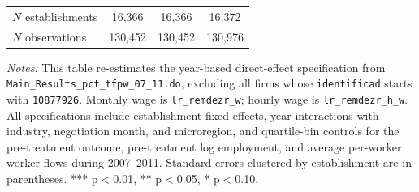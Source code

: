 \begin{table}[!htbp]
\begin{tabular}{lccc}
$N$ establishments & 16{,}366 & 16{,}366 & 16{,}372\\
$N$ observations & 130{,}452 & 130{,}452 & 130{,}976\\
\bottomrule
\end{tabular}
\begin{minipage}{\linewidth}
\footnotesize\vspace{4pt}
\textit{Notes:} This table re-estimates the year-based direct-effect specification from \texttt{Main\_Results\_pct\_tfpw\_07\_11.do}, excluding all firms whose \texttt{identificad} starts with \texttt{10877926}. Monthly wage is \texttt{lr\_remdezr\_w}; hourly wage is \texttt{lr\_remdezr\_h\_w}. All specifications include establishment fixed effects, year interactions with industry, negotiation month, and microregion, and quartile-bin controls for the pre-treatment outcome, pre-treatment log employment, and average per-worker worker flows during 2007--2011. Standard errors clustered by establishment are in parentheses. *** p$<$0.01, ** p$<$0.05, * p$<$0.10.
\end{minipage}
\end{table}
